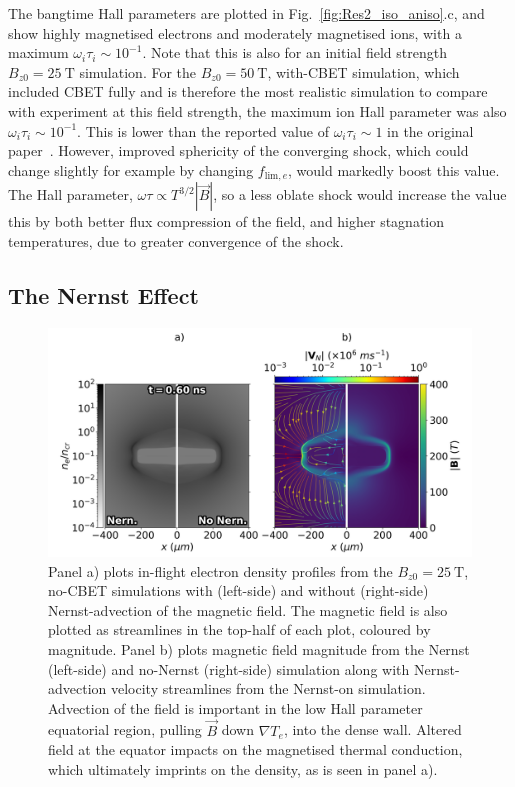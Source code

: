 The bangtime Hall parameters are plotted in Fig.~\ref{fig:Res2_iso_aniso}.c, and show highly magnetised electrons and moderately magnetised ions, with a maximum $\omega_i\tau_i\sim10^{-1}$.
Note that this is also for an initial field strength $B_{z0}=25\ \text{T}$ simulation.
For the $B_{z0}=50\ \text{T}$, with-\ac{CBET} simulation, which included \ac{CBET} fully and is therefore the most realistic simulation to compare with experiment at this field strength, the maximum ion Hall parameter was also $\omega_i\tau_i\sim10^{-1}$.
This is lower than the reported value of $\omega_i\tau_i\sim1$ in the original paper~\cite{bose_effect_2022}.
However, improved sphericity of the converging shock, which could change slightly for example by changing $f_{\text{lim},e}$, would markedly boost this value.
The Hall parameter, $\omega\tau\propto T^{3/2}|\vec{B}|$, so a less oblate shock would increase the value this by both better flux compression of the field, and higher stagnation temperatures, due to greater convergence of the shock.

\subsection{The Nernst Effect}%
\label{sec:Res2_nernst}

\begin{figure}[t!]
    \includegraphics[width=\linewidth]{Results2/Images/nernst_comp_Bstream.png}
    \centering
    \caption{Panel a) plots in-flight electron density profiles from the $B_{z0}=25\ \text{T}$, no-\ac{CBET} simulations with (left-side) and without (right-side) Nernst-advection of the magnetic field.
    The magnetic field is also plotted as streamlines in the top-half of each plot, coloured by magnitude.
    Panel b) plots magnetic field magnitude from the Nernst (left-side) and no-Nernst (right-side) simulation along with Nernst-advection velocity streamlines from the Nernst-on simulation.
    Advection of the field is important in the low Hall parameter equatorial region, pulling $\vec{B}$ down $\nabla T_e$, into the dense wall.
    Altered field at the equator impacts on the magnetised thermal conduction, which ultimately imprints on the density, as is seen in panel a).}%
    \label{fig:Res2_nernst_comp}
\end{figure}

